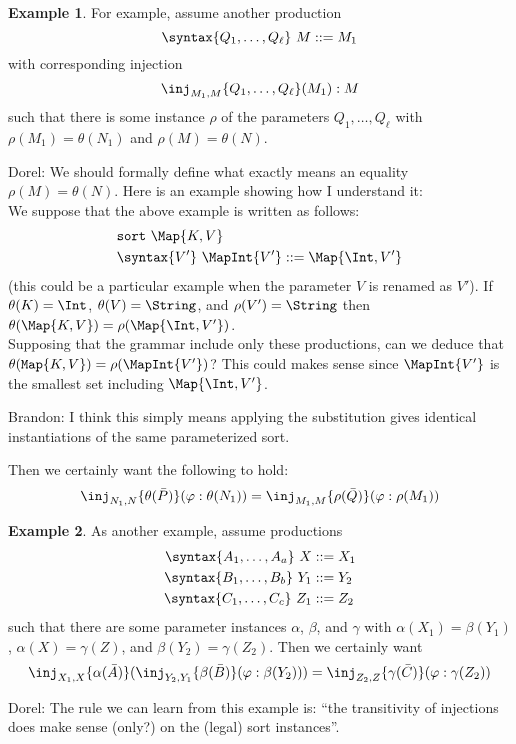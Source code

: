\documentclass{article}
\newcommand\comment[2]{\par\noindent\color{red}#1: #2\color{black}\par\noindent}
\newcommand\dl{\comment{Dorel}}
\theoremstyle{definition}
\newtheorem{example}{Example}[section]
\theoremstyle{definition}
\theoremstyle{definition}
\theoremstyle{theorem}
\theoremstyle{theorem}
\theoremstyle{theorem}
\newcommand{\sort}{\texttt{sort}}
\begin{document}
\begin{example}\label{consistency-parallel}
For example, assume another production
\[\syntax\{Q_1,\ldots,Q_\ell\}\ M::=M_1\]
with corresponding injection
\[\inj_{M_1,M}\{Q_1,\ldots,Q_\ell\}(M_1):M\]
such that there is some instance \(\rho\) of the parameters
\(Q_1,\ldots,Q_\ell\) with \(\rho(M_1) = \theta(N_1)\) and
\(\rho(M) = \theta(N)\).
\dl{We should formally define what exactly means an equality $\rho(M)=\theta(N)$. Here is an example showing how I understand it:
\\
We suppose that the above example is written as follows:
\begin{align*}
&\sort\ \Map{K,V}\\
&\syntax\{V'\}\ \MapInt{V'} ::= \Map{\Int, V'}
\end{align*}
(this could be a particular example when the parameter $V$ is renamed as $V'$).
If \(\theta(K)=\Int\), \(\theta(V)=\String\),
and \(\rho(V')=\String\) then \(\theta(\Map{K,V})=\rho(\Map{\Int,V'})\).
\\
Supposing that the grammar include only these productions, can we deduce that
\(\theta({\tt Map}\{K,V\})=\rho(\MapInt{V'})\)?
This could makes sense since \(\MapInt{V'}\) is the smallest set including \(\Map{\Int,V'}\).
}
\comment{Brandon}{
I think this simply means applying the substitution gives identical instantiations
of the same parameterized sort.
}
Then we certainly want the following to hold:
\[\inj_{N_1,N}\{\theta(\bar{P})\}(\varphi:\theta(N_1))
 = \inj_{M_1,M}\{\rho(\bar{Q})\}(\varphi:\rho(M_1))\]
\end{example}

\begin{example}\label{consistency-compose}
As another example, assume productions
\begin{align*}
\syntax\{A_1,\ldots,A_a\}\ X & ::=X_1\\
\syntax\{B_1,\ldots,B_b\}\ Y_1 & ::=Y_2\\
\syntax\{C_1,\ldots,C_c\}\ Z_1 & ::=Z_2\\
\end{align*}
such that there are some parameter instances
\(\alpha\), \(\beta\), and \(\gamma\) with
\(\alpha(X_1) = \beta(Y_1)\), \(\alpha(X) = \gamma(Z)\),
and \(\beta(Y_2) = \gamma(Z_2)\).
Then we certainly want
\[\inj_{X_1,X}\{\alpha(\bar{A})\}(
  \inj_{Y_2,Y_1}\{\beta(\bar{B})\}(\varphi:\beta(Y_2)))
 = \inj_{Z_2,Z}\{\gamma(\bar{C})\}(\varphi:\gamma(Z_2))\]
\dl{The rule we can learn from this example is: ``the transitivity of injections does make sense (only?) on the (legal) sort instances''.}
\end{example}
\end{document}
